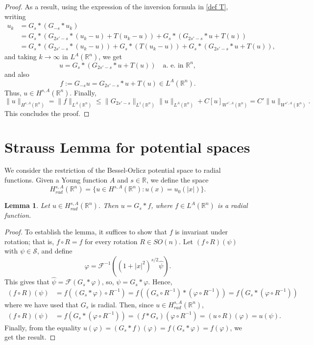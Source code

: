 \documentclass[leqno,twoside, 12pt]{amsart}
\theoremstyle{plain}
\numberwithin{equation}{section} \numberwithin{figure}{section}
\newtheorem{lemma}[theorem]{Lemma}
\theoremstyle{definition}
\newcommand{\R}{\mathbb R}
\numberwithin{equation}{section}
\begin{document}
\begin{proof}
As a result, using the expression of the inversion formula in \eqref{def T}, writing
\begin{equation}
\begin{split}
u_k & =G_{s}*(G_{-s}*u_k)\\& = G_s*\left(G_{2s'-s}*(u_k-u)+T(u_k-u) \right)+ G_s*\left( G_{2s'-s}*u+T(u)\right)\\ & =  G_s*\left(G_{2s'-s}*(u_k-u)\right) + G_s*\left(T(u_k-u) \right)+ G_s*\left( G_{2s'-s}*u+T(u)\right),
\end{split}
\end{equation}and taking $k\to \infty$ in $L^A(\R^n)$, we get
$$u=G_s*\left( G_{2s'-s}*u+T(u)\right) \quad \text{a. e. in }\R^n,$$and also
$$f:=G_{-s}u = G_{2s'-s}*u+T(u) \in L^A(\R^n).$$Thus, $u\in H^{s, A}(\R^n)$. Finally,
$$\|u\|_{H^{s, A}(\R^n)}=\|f\|_{L^A(\R^n)}\leq  \|G_{2s'-s}\|_{L^1(\R^n)}\|u\|_{L^A(\R^n)}+ C[u]_{W^{s', A}(\R^n)}=C'\|u\|_{W^{s', A}(\R^n)}.$$
This concludes the proof. 
\end{proof} 



\section{Strauss Lemma for potential spaces} \label{sec.strauss}


We consider the restriction of the Bessel-Orlicz potential space to radial functions. Given a Young function $A$ and $s\in \R$, we define the space
$$
H^{s,A}_{rad}(\R^n) =\{u \in H^{s,A}(\R^n)\colon u(x)=u_0(|x|)\}.
$$

\begin{lemma} \label{lema.radial}
Let $u\in H^{s,A}_{rad}(\R^n)$. Then $u=G_s*f$, where $f\in L^A(\R^n)$ is a radial function.
\end{lemma}
\begin{proof}
To establish the lemma, it suffices to show that $f$ is invariant under rotation; that is, $f \circ R = f$ for every rotation $R \in SO(n)$. Let $ (f\circ R)(\psi)$ with $\psi\in \mathcal{S}$, and define
$$
\varphi=\mathcal{F}^{-1}((1+|x|^2)^{s/2} \hat\psi).
$$
This gives that $\hat \psi=\mathcal{F}(G_s*\varphi)$, so, $\psi = G_s*\varphi$. Hence, 
\begin{align*}
 (f\circ R) (\psi) &=  f \left((G_s* \varphi)\circ R^{-1}\right) = 
 f \left((G_s\circ R^{-1})* (\varphi \circ R^{-1} )\right)
= 
 f \left( G_s* (\varphi \circ R^{-1} )\right)
\end{align*}
where we have used that $G_s$ is radial. Then, since $u\in H^{s,A}_{rad}(\R^n)$, 
\begin{align*}
( f\circ R)( \psi) &= 
 f\left( G_s* (\varphi \circ R^{-1} )\right)
= 
(f*G_s)( \varphi \circ R^{-1})
= 
( u\circ R) (\varphi)  
= 
 u( \psi).
\end{align*}
Finally, from the equality $ u( \varphi )= ( G_s*f)( \varphi)  =  f(G_s*\varphi) =  f(\varphi)$, we get the result.
\end{proof}
\end{document}
